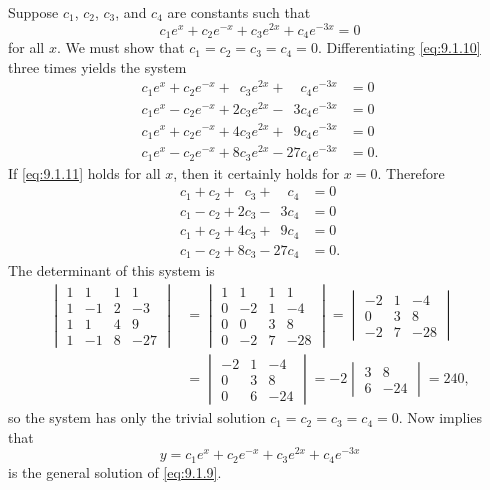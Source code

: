 \begin{solution}
Suppose   $c_1$, $c_2$, $c_3$, and $c_4$
are constants such that
\begin{equation} \label{eq:9.1.10}
c_1e^x+c_2e^{-x}+c_3e^{2x}+c_4e^{-3x}=0
\end{equation}
for all $x$. We must show that $c_1=c_2=c_3=c_4=0$. Differentiating
\eqref{eq:9.1.10} three times yields the system
\begin{equation} \label{eq:9.1.11}
\begin{aligned}
c_1e^x+c_2e^{-x}+\phantom{2}c_3e^{2x}+\phantom{27}c_4e^{-3x}&=0\\
c_1e^x-c_2e^{-x}+2c_3e^{2x}-\phantom{2}3c_4e^{-3x}&=0\\
c_1e^x+c_2e^{-x}+4c_3e^{2x}+\phantom{2}9c_4e^{-3x}&=0\\
c_1e^x-c_2e^{-x}+8c_3e^{2x}-27c_4e^{-3x}&=0.
\end{aligned}
\end{equation}
If \eqref{eq:9.1.11} holds for all $x$, then it certainly holds for $x=0$.
Therefore
\begin{align*}
c_1+c_2+\phantom{2}c_3+\phantom{27}c_4&=0\\
c_1-c_2+2c_3-\phantom{2}3c_4&=0\\
c_1+c_2+4c_3+\phantom{2}9c_4&=0\\
c_1-c_2+8c_3-27c_4&=0.
\end{align*}
The determinant of this system is
\begin{equation} \label{eq:9.1.12}
\begin{aligned}
\begin{vmatrix}1&1&1&1\\1&-1&2&-3\\1&1&4&9\\1&-1&8&-27\end{vmatrix}
&=\begin{vmatrix}1&1&1&1\\0&-2&1&-4\\0&0&3&8\\0&-2&7&-28\end{vmatrix}
=\begin{vmatrix}-2&1&-4\\0&3&8\\-2&7&-28\end{vmatrix}\\
&=\begin{vmatrix}-2&1&-4\\0&3&8\\0&6&-24\end{vmatrix}
=-2\begin{vmatrix}3&8\\6&-24\end{vmatrix}=240,
\end{aligned}
\end{equation}
so the system has only the trivial solution $c_1=c_2=c_3=c_4=0$.
Now  implies that
\[
y=c_1e^x+c_2e^{-x}+c_3e^{2x}+c_4e^{-3x}
\]
is the general solution of \eqref{eq:9.1.9}.
\end{solution}


